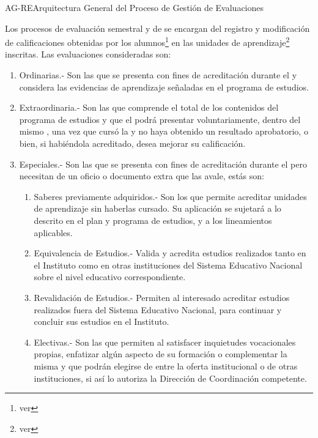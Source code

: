 \begin{Arquitectura}{AG-RE}{Arquitectura General del Proceso de Gestión de Evaluaciones} {
		Los procesos de evaluación semestral y de  se encargan del registro y modificación de calificaciones obtenidas por los alumnos\footnote{ver } en las unidades de aprendizaje\footnote{ver } inscritas. Las evaluaciones consideradas son:
		\begin{enumerate}
			\item Ordinarias.- Son las que se presenta con fines de acreditación durante el  y considera las evidencias de aprendizaje señaladas en el programa de estudios.
			\item Extraordinaria.- Son las que comprende el total de los contenidos del programa de estudios y que el  podrá presentar voluntariamente, dentro del mismo , una vez que cursó la  y no haya obtenido un resultado aprobatorio, o bien, si habiéndola acreditado, desea mejorar su calificación.
			\item Especiales.- Son las que se presenta con fines de acreditación durante el  pero necesitan de un oficio o documento extra que las avale, estás son:
			\begin{enumerate}
				\item Saberes previamente adquiridos.- Son los que permite acreditar unidades de aprendizaje sin haberlas cursado. Su aplicación se sujetará a lo descrito en el plan y programa de estudios, y a los lineamientos aplicables.
				\item Equivalencia de Estudios.- Valida y acredita estudios realizados tanto en el Instituto como	en otras instituciones del Sistema Educativo Nacional sobre el nivel educativo correspondiente.
				\item Revalidación de Estudios.- Permiten al interesado acreditar estudios realizados fuera del Sistema Educativo Nacional, para continuar y concluir sus estudios en el Instituto.
				\item Electivas.- Son las que permiten al  satisfacer	inquietudes vocacionales propias, enfatizar algún aspecto de su formación o complementar la misma y que podrán elegirse de entre la oferta institucional o de otras instituciones, si así lo autoriza la Dirección de Coordinación competente.

\end{enumerate}
\end{enumerate}}
\end{Arquitectura}
